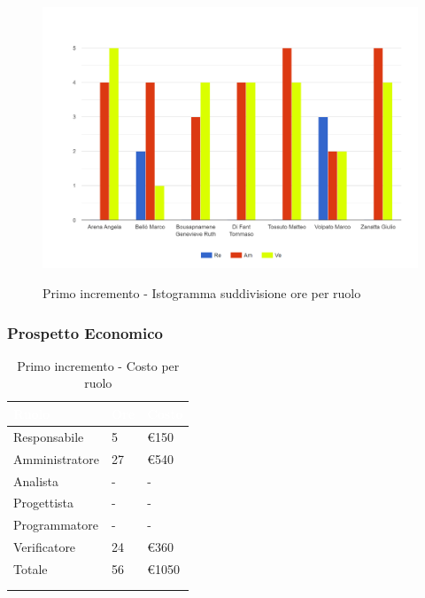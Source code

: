 {{      \begin{figure}[H]
        \includegraphics[width=15cm]{sezioni/Images/primo.png}
        \centering
        \\
        \caption{Primo incremento - Istogramma suddivisione ore per ruolo}
     \end{figure}
    }

    \subsubsection{Prospetto Economico}
    {
        \setlength{\freewidth}{\dimexpr\textwidth-30\tabcolsep}
        \renewcommand{\arraystretch}{1.0}
        \setlength{\aboverulesep}{0pt}
        \setlength{\belowrulesep}{0pt}
        \begin{longtable}{C{.3\freewidth} C{.2\freewidth} C{.2\freewidth}}
          \toprule
        \textcolor{white}{\textbf{Ruolo}}&
        \textcolor{white}{\textbf{Ore}}&
        \textcolor{white}{\textbf{Costo}}\\
        \toprule
        \endhead
            
        Responsabile & 5 & €150\\        
        Amministratore & 27 & €540\\        
        Analista & - &-\\        
        Progettista&-&-\\        
        Programmatore&-&-\\
        Verificatore&24 & €360\\
        Totale&56&€1050\\
        \bottomrule
        \\
        \caption{Primo incremento - Costo per ruolo}


\end{longtable}}}
